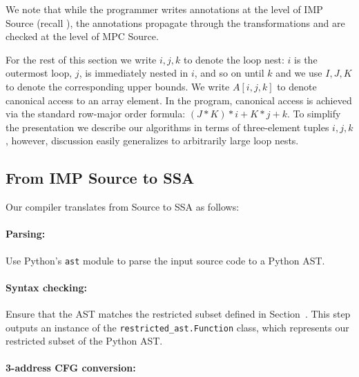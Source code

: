We note that while the programmer writes
annotations at the level of IMP Source (recall ), the
annotations propagate through the transformations and are checked at the
level of MPC Source.


For the rest of this section we write $i,j,k$ to denote the loop nest: $i$ is the outermost loop, $j$, is immediately nested in $i$, and so on until $k$
and we use $I,J,K$ to denote the corresponding upper bounds. We write $A[i,j,k]$ to denote canonical access
to an array element. In the program, canonical access is achieved via the standard row-major order formula: $(J*K)*i + K*j + k$.
To simplify the presentation we describe our algorithms in terms of three-element tuples $i,j,k$, however, discussion easily generalizes to
arbitrarily large loop nests.



\subsection{From IMP Source to SSA}
\label{sec:imp_to_ssa}


Our compiler translates from Source to SSA as follows:

        \paragraph{Parsing:}
        Use Python's \texttt{ast} module to parse the input source code to a Python AST.
        \paragraph{Syntax checking:}
        Ensure that the AST matches the restricted subset defined in Section~.
        This step outputs an instance of the \texttt{restricted\_ast.Function} class, which represents our restricted subset of the Python AST.
        \paragraph{3-address CFG conversion:}

